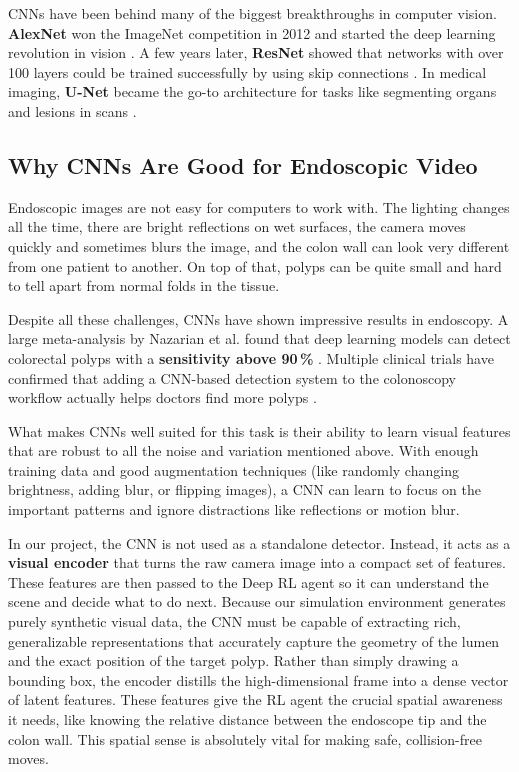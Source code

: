 CNNs have been behind many of the biggest breakthroughs in computer vision. \textbf{AlexNet} won the ImageNet competition in 2012 and started the deep learning revolution in vision \cite{krizhevsky2012alexnet}. A few years later, \textbf{ResNet} showed that networks with over 100 layers could be trained successfully by using skip connections \cite{he2016resnet}. In medical imaging, \textbf{U-Net} became the go-to architecture for tasks like segmenting organs and lesions in scans \cite{ronneberger2015unet}.


\subsection{Why CNNs Are Good for Endoscopic Video}

Endoscopic images are not easy for computers to work with. The lighting changes all the time, there are bright reflections on wet surfaces, the camera moves quickly and sometimes blurs the image, and the colon wall can look very different from one patient to another. On top of that, polyps can be quite small and hard to tell apart from normal folds in the tissue.

Despite all these challenges, CNNs have shown impressive results in endoscopy. A large meta-analysis by Nazarian et al. found that deep learning models can detect colorectal polyps with a \textbf{sensitivity above 90\,\%} \cite{nazarian2021jmir}. Multiple clinical trials have confirmed that adding a CNN-based detection system to the colonoscopy workflow actually helps doctors find more polyps \cite{wang2019cade,repici2020cade}.

What makes CNNs well suited for this task is their ability to learn visual features that are robust to all the noise and variation mentioned above. With enough training data and good augmentation techniques (like randomly changing brightness, adding blur, or flipping images), a CNN can learn to focus on the important patterns and ignore distractions like reflections or motion blur.

In our project, the CNN is not used as a standalone detector. Instead, it acts as a \textbf{visual encoder} that turns the raw camera image into a compact set of features. These features are then passed to the Deep RL agent so it can understand the scene and decide what to do next. Because our simulation environment generates purely synthetic visual data, the CNN must be capable of extracting rich, generalizable representations that accurately capture the geometry of the lumen and the exact position of the target polyp. Rather than simply drawing a bounding box, the encoder distills the high-dimensional frame into a dense vector of latent features. These features give the RL agent the crucial spatial awareness it needs, like knowing the relative distance between the endoscope tip and the colon wall. This spatial sense is absolutely vital for making safe, collision-free moves.

